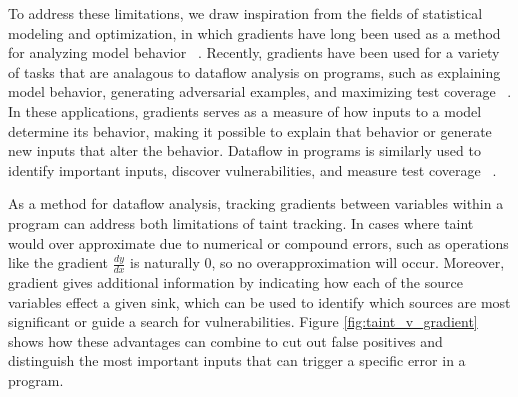 

To address these limitations, we draw inspiration from the fields of statistical modeling and optimization, in which gradients have long been used as a method for analyzing model behavior ~\cite{cook1986assessment}. Recently, gradients have been used for a variety of tasks that are analagous to dataflow analysis on programs, such as explaining model behavior, generating adversarial examples, and maximizing test coverage  ~\cite{baehrens2010explain, simonyan2013deep, shrikumar2017learning, goodfellow2014explaining, pei2017deepxplore}. In these applications, gradients serves as a measure of how inputs to a model determine its behavior, making it possible to explain that behavior or generate new inputs that alter the behavior. Dataflow in programs is similarly used to identify important inputs, discover vulnerabilities, and measure test coverage ~\cite{ganesh2009taint, rawat2017vuzzer, newsome2005dynamic, hutchins1994experiments}. 




As a method for dataflow analysis, tracking gradients between variables within a program can address both limitations of taint tracking. In cases where taint would over approximate due to numerical or compound errors, such as operations like  the gradient $\tfrac{dy}{dx}$ is naturally $0$, so no overapproximation will occur. Moreover, gradient gives additional information by indicating how each of the source variables effect a given sink, which can be used to identify which sources are most significant or guide a search for vulnerabilities. Figure \ref{fig:taint_v_gradient} shows how these advantages can combine to cut out false positives and distinguish the most important inputs that can trigger a specific error in a program.


